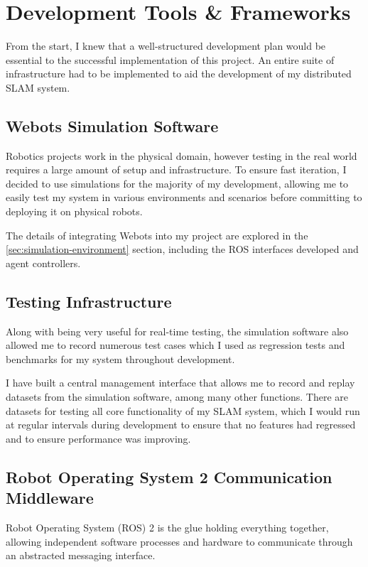 \section{Development Tools \& Frameworks}
\label{sec:development-tools-and-frameworks}
From the start, I knew that a well-structured development plan would be essential to the successful implementation of this project. An entire suite of infrastructure had to be implemented to aid the development of my distributed SLAM system.

\subsection{Webots Simulation Software}
\label{sec:webots-simulator}

Robotics projects work in the physical domain, however testing in the real world requires a large amount of setup and infrastructure. To ensure fast iteration, I decided to use simulations for the majority of my development, allowing me to easily test my system in various environments and scenarios before committing to deploying it on physical robots.

The details of integrating Webots into my project are explored in the \autoref{sec:simulation-environment} section, including the ROS interfaces developed and agent controllers.

\subsection{Testing Infrastructure}
\label{sec:testing-infrastructure}

Along with being very useful for real-time testing, the simulation software also allowed me to record numerous test cases which I used as regression tests and benchmarks for my system throughout development.

I have built a central management interface that allows me to record and replay datasets from the simulation software, among many other functions. There are datasets for testing all core functionality of my SLAM system, which I would run at regular intervals during development to ensure that no features had regressed and to ensure performance was improving.

\subsection{Robot Operating System 2 Communication Middleware}
\label{sec:ros-2}
Robot Operating System (ROS) 2 is the glue holding everything together, allowing independent software processes and hardware to communicate through an abstracted messaging interface.

